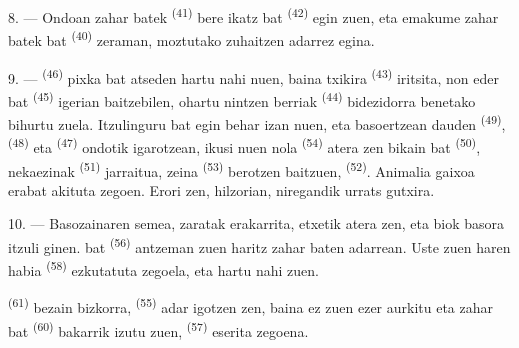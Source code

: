 8. --- Ondoan  zahar batek \textsuperscript{(41)} bere
 ikatz  bat \textsuperscript{(42)} egin zuen, eta
emakume zahar batek   bat \textsuperscript{(40)}
zeraman, moztutako zuhaitzen adarrez egina.

\VUsaut{3.0mm}
\VUsaut{3.0mm}

9. ---  \textsuperscript{(46)} pixka bat atseden hartu
nahi nuen, baina  txikira \textsuperscript{(43)} iritsita, non
 eder bat \textsuperscript{(45)} igerian baitzebilen, ohartu
nintzen  berriak \textsuperscript{(44)} bidezidorra benetako
 bihurtu zuela. Itzulinguru bat egin behar izan nuen, eta
basoertzean dauden  \textsuperscript{(49)}, 
\textsuperscript{(48)} eta  \textsuperscript{(47)} ondotik
igarotzean, ikusi nuen nola  \textsuperscript{(54)} atera zen
 bikain bat \textsuperscript{(50)}, 
nekaezinak \textsuperscript{(51)} jarraitua, zeina 
\textsuperscript{(53)} berotzen baitzuen, 
\textsuperscript{(52)}. Animalia gaixoa erabat akituta zegoen. Erori zen, hilzorian, niregandik
urrats gutxira.

10. --- Basozainaren semea,  zaratak erakarrita, etxetik atera
zen, eta biok basora itzuli ginen.  bat \textsuperscript{(56)}
antzeman zuen haritz zahar baten adarrean. Uste zuen haren habia
 \textsuperscript{(58)} ezkutatuta zegoela, eta hartu nahi zuen.

 \textsuperscript{(61)} bezain bizkorra, 
\textsuperscript{(55)} adar igotzen zen, baina ez zuen ezer aurkitu eta
 zahar bat \textsuperscript{(60)} bakarrik izutu zuen,
 \textsuperscript{(57)} eserita zegoena.
\VUsaut{4.0mm}
\VUfilet{22mm}
